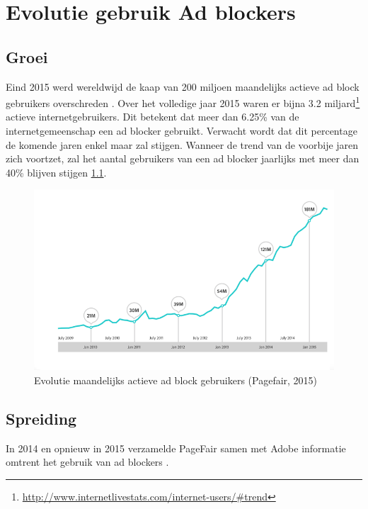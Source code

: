 \documentclass[pdftex,a4paper,12pt,twoside]{report}
\begin{document}
\chapter{Evolutie gebruik Ad blockers}
\label{ch:Evolutie gebruik Ad blockers}

\section{Groei}
\label{sec:Groei}
Eind 2015 werd wereldwijd de kaap van 200 miljoen maandelijks actieve ad block gebruikers overschreden \citep{PageFair2015}. Over het volledige jaar 2015 waren er bijna 3.2 miljard\footnote{\url{ http://www.internetlivestats.com/internet-users/\#trend}} actieve internetgebruikers. Dit betekent dat meer dan 6.25\% van de internetgemeenschap een ad blocker gebruikt. Verwacht wordt dat dit percentage de komende jaren enkel maar zal stijgen. Wanneer de trend van de voorbije jaren zich voortzet, zal het aantal gebruikers van een ad blocker jaarlijks met meer dan 40\% blijven stijgen \ref{fig: adblock-growth}.
\begin{figure}[h!]
\centering
\includegraphics[width=12cm]{img/adblock-growth}
\caption{Evolutie maandelijks actieve ad block gebruikers (Pagefair, 2015)}
\label{fig: adblock-growth}
\end{figure}



\section{Spreiding}
\label{sec:Spreiding}
In 2014 en opnieuw in 2015 verzamelde PageFair samen met Adobe informatie omtrent het gebruik van ad blockers \citep{PageFair2015,PageFair2014}.
\end{document}
